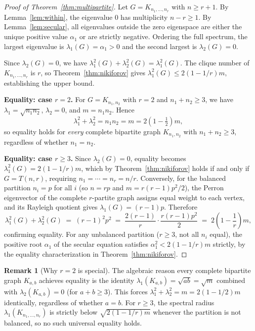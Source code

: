 \documentclass[preprint,12pt]{elsarticle}
\theoremstyle{plain}
\theoremstyle{definition}
\newtheorem{remark}[theorem]{Remark}
\begin{document}
\begin{proof}[Proof of Theorem~\ref{thm:multipartite}]
Let $G = K_{n_1,\ldots,n_r}$ with $n \geq r+1$.
By Lemma~\ref{lem:within}, the eigenvalue $0$ has multiplicity $n-r \geq 1$.
By Lemma~\ref{lem:secular}, all eigenvalues outside the zero eigenspace
are either the unique positive value $\alpha_1$ or are strictly negative.
Ordering the full spectrum, the largest eigenvalue is $\lambda_1(G) = \alpha_1 > 0$
and the second largest is $\lambda_2(G) = 0$.

Since $\lambda_2(G) = 0$, we have $\lambda_1^2(G) + \lambda_2^2(G) = \lambda_1^2(G)$.
The clique number of $K_{n_1,\ldots,n_r}$ is $r$, so
Theorem~\ref{thm:nikiforov} gives
$\lambda_1^2(G) \leq 2(1-1/r)m$,
establishing the upper bound.

\medskip
\noindent\textbf{Equality: case $r = 2$.}
For $G = K_{n_1,n_2}$ with $r = 2$ and $n_1 + n_2 \geq 3$, we have
$\lambda_1 = \sqrt{n_1 n_2}$, $\lambda_2 = 0$, and $m = n_1 n_2$.  Hence
\[
  \lambda_1^2 + \lambda_2^2
  = n_1 n_2
  = m
  = 2\!\left(1 - \tfrac{1}{2}\right)m,
\]
so equality holds for \emph{every} complete bipartite graph $K_{n_1,n_2}$
with $n_1 + n_2 \geq 3$, regardless of whether $n_1 = n_2$.

\medskip
\noindent\textbf{Equality: case $r \geq 3$.}
Since $\lambda_2(G) = 0$, equality becomes $\lambda_1^2(G) = 2(1-1/r)m$,
which by Theorem~\ref{thm:nikiforov} holds if and only if $G = T(n,r)$,
requiring $n_1 = \cdots = n_r = n/r$.
Conversely, for the balanced partition $n_i = p$ for all $i$
(so $n = rp$ and $m = r(r-1)p^2/2$), the Perron eigenvector of the
complete $r$-partite graph assigns equal weight to each vertex, and
its Rayleigh quotient gives $\lambda_1(G) = (r-1)p$.
Therefore
\[
  \lambda_1^2(G) + \lambda_2^2(G)
  \;=\; (r-1)^2 p^2
  \;=\; \frac{2(r-1)}{r} \cdot \frac{r(r-1)p^2}{2}
  \;=\; 2\!\left(1-\frac{1}{r}\right)m,
\]
confirming equality.
For any unbalanced partition ($r \geq 3$, not all $n_i$ equal), the
positive root $\alpha_1$ of the secular equation satisfies
$\alpha_1^2 < 2(1-1/r)m$ strictly, by the equality characterization in
Theorem~\ref{thm:nikiforov}.
\end{proof}

\begin{remark}[Why $r=2$ is special]
  \label{rem:r2-equality}
  The algebraic reason every complete bipartite graph $K_{a,b}$ achieves
  equality is the identity $\lambda_1(K_{a,b}) = \sqrt{ab} = \sqrt{m}$
  combined with $\lambda_2(K_{a,b}) = 0$ (for $a + b \geq 3$).
  This forces $\lambda_1^2 + \lambda_2^2 = m = 2(1-1/2)m$ identically,
  regardless of whether $a = b$.
  For $r \geq 3$, the spectral radius $\lambda_1(K_{n_1,\ldots,n_r})$
  is strictly below $\sqrt{2(1-1/r)m}$ whenever the partition is not
  balanced, so no such universal equality holds.
\end{remark}
\end{document}
